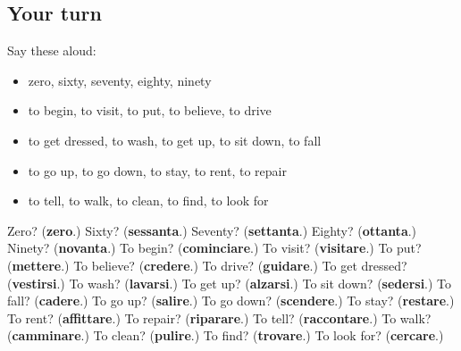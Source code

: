 \subsection*{Your turn}
Say these aloud:

\begin{itemize}
\raggedright
  \item zero, sixty, seventy, eighty, ninety
  \item to begin, to visit, to put, to believe, to drive
  \item to get dressed, to wash, to get up, to sit down, to fall
  \item to go up, to go down, to stay, to rent, to repair
  \item to tell, to walk, to clean, to find, to look for
\end{itemize}

\begin{tcolorbox}[breakable,colback=teal!4,colframe=teal!35!black,title={Before you move on}]
Zero? (\textbf{zero}.) Sixty? (\textbf{sessanta}.) Seventy? (\textbf{settanta}.) Eighty? (\textbf{ottanta}.) Ninety? (\textbf{novanta}.) To begin? (\textbf{cominciare}.) To visit? (\textbf{visitare}.) To put? (\textbf{mettere}.) To believe? (\textbf{credere}.) To drive? (\textbf{guidare}.) To get dressed? (\textbf{vestirsi}.) To wash? (\textbf{lavarsi}.) To get up? (\textbf{alzarsi}.) To sit down? (\textbf{sedersi}.) To fall? (\textbf{cadere}.) To go up? (\textbf{salire}.) To go down? (\textbf{scendere}.) To stay? (\textbf{restare}.) To rent? (\textbf{affittare}.) To repair? (\textbf{riparare}.) To tell? (\textbf{raccontare}.) To walk? (\textbf{camminare}.) To clean? (\textbf{pulire}.) To find? (\textbf{trovare}.) To look for? (\textbf{cercare}.)
\end{tcolorbox}
